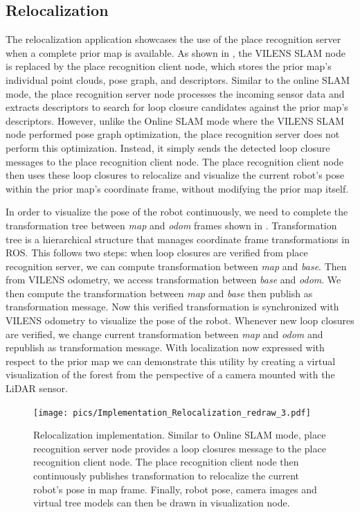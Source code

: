 \subsection{Relocalization}
The relocalization application showcases the use of the place recognition server when a complete prior map is available. As shown in , the VILENS SLAM node is replaced by the place recognition client node, which stores the prior map's individual point clouds, pose graph, and descriptors. Similar to the online SLAM mode, the place recognition server node processes the incoming sensor data and extracts descriptors to search for loop closure candidates against the prior map's descriptors. However, unlike the Online SLAM mode where the VILENS SLAM node performed pose graph optimization, the place recognition server does not perform this optimization. Instead, it simply sends the detected loop closure messages to the place recognition client node. The place recognition client node then uses these loop closures to relocalize and visualize the current robot's pose within the prior map's coordinate frame, without modifying the prior map itself.

In order to visualize the pose of the robot continuously, we need to complete the transformation tree between \emph{map} and \emph{odom} frames shown in . Transformation tree is a hierarchical structure that manages coordinate frame transformations in ROS. This follows two steps: when loop closures are verified from place recognition server, we can compute transformation between \emph{map} and \emph{base}. Then from VILENS odometry, we access transformation between \emph{base} and \emph{odom}. We then compute the transformation between \emph{map} and \emph{base} then publish as transformation message. Now this verified transformation is synchronized with VILENS odometry to visualize the pose of the robot. Whenever new loop closures are verified, we change current transformation between \emph{map} and \emph{odom} and republish as transformation message. With localization now expressed with respect to the prior map we can demonstrate this utility by creating a virtual visualization of
the forest from the perspective of a camera mounted with the LiDAR sensor.

\begin{figure}[htbp]
  \centering
  \texttt{[image: pics/Implementation\_Relocalization\_redraw\_3.pdf]}
  \caption{Relocalization implementation. Similar to Online SLAM mode, place recognition server node provides a loop closures message to the place recognition client node. The place recognition client node then continuously publishes transformation to relocalize the current robot's pose in map frame. Finally, robot pose, camera images and virtual tree models can then be drawn in visualization node.}
  \label{fig:implementation_relocalization}
\end{figure}



